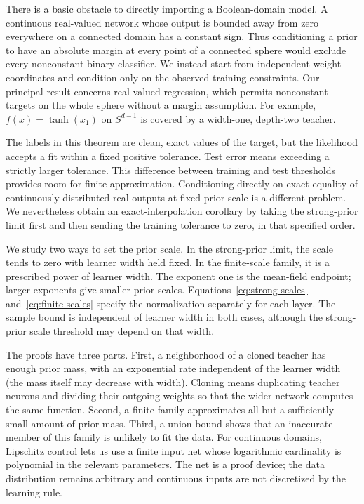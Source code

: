 \documentclass[11pt]{article}
\theoremstyle{remark}\newtheorem{remark}[theorem]{Remark}
\begin{document}
There is a basic obstacle to directly importing a Boolean-domain model.
A continuous real-valued network whose output is bounded away from zero
everywhere on a connected domain has a constant sign. Thus conditioning a
prior to have an absolute margin at every point of a connected sphere
would exclude every nonconstant binary classifier. We instead start from
independent weight coordinates and condition only on the observed
training constraints. Our principal result concerns real-valued regression,
which permits nonconstant targets on the whole sphere without a margin
assumption. For example, $f(x)=\tanh(x_1)$ on $S^{d-1}$ is covered by a
width-one, depth-two teacher.

The labels in this theorem are clean, exact values of the target, but the
likelihood accepts a fit within a fixed positive tolerance. Test error
means exceeding a strictly larger tolerance. This difference between
training and test thresholds provides room for finite approximation.
Conditioning directly on exact equality of continuously distributed real
outputs at fixed prior scale is a different problem. We nevertheless obtain
an exact-interpolation corollary by taking the strong-prior limit first and
then sending the training tolerance to zero, in that specified order.

We study two ways to set the prior scale. In the strong-prior limit, the
scale tends to zero with learner width held fixed. In the finite-scale
family, it is a prescribed power of learner width. The exponent one is
the mean-field endpoint; larger exponents give smaller prior scales.
Equations~\eqref{eq:strong-scales} and~\eqref{eq:finite-scales} specify
the normalization separately for each layer. The sample bound is
independent of learner width in both cases, although the strong-prior
scale threshold may depend on that width.

The proofs have three parts. First, a neighborhood of a cloned teacher has
enough prior mass, with an exponential rate independent of the learner
width (the mass itself may decrease with width). Cloning means duplicating
teacher neurons and dividing their outgoing weights so that the wider
network computes the same function. Second, a finite family
approximates all but a sufficiently small amount of prior mass. Third, a
union bound shows that an inaccurate member of this family is unlikely to
fit the data. For continuous domains, Lipschitz control lets us use a finite
input net whose logarithmic cardinality is polynomial in the relevant
parameters. The net is a proof device; the data distribution remains
arbitrary and continuous inputs are not discretized by the learning rule.
\end{document}
